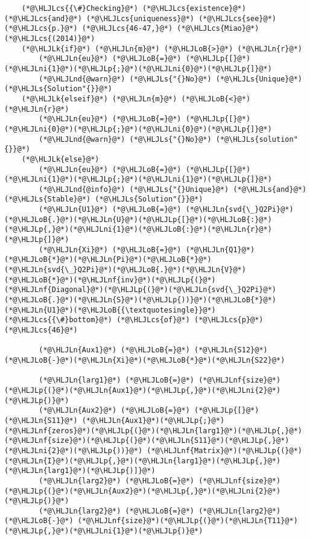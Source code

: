\documentclass[12pt,a4paper]{article}
\newcommand{\HLJLk}[1]{\textcolor[RGB]{148,91,176}{\textbf{#1}}}
\newcommand{\HLJLn}[1]{#1}
\newcommand{\HLJLnd}[1]{\textcolor[RGB]{214,102,97}{#1}}
\newcommand{\HLJLnf}[1]{\textcolor[RGB]{66,102,213}{#1}}
\newcommand{\HLJLs}[1]{\textcolor[RGB]{201,61,57}{#1}}
\newcommand{\HLJLni}[1]{\textcolor[RGB]{59,151,46}{#1}}
\newcommand{\HLJLoB}[1]{\textcolor[RGB]{102,102,102}{\textbf{#1}}}
\newcommand{\HLJLp}[1]{#1}
\newcommand{\HLJLcs}[1]{\textcolor[RGB]{153,153,119}{\textit{#1}}}
\begin{document}
\begin{lstlisting}
    (*@\HLJLcs{{\#}Checking}@*) (*@\HLJLcs{existence}@*) (*@\HLJLcs{and}@*) (*@\HLJLcs{uniqueness}@*) (*@\HLJLcs{see}@*) (*@\HLJLcs{p.}@*) (*@\HLJLcs{46-47,}@*) (*@\HLJLcs{Miao}@*) (*@\HLJLcs{(2014)}@*)
    (*@\HLJLk{if}@*) (*@\HLJLn{m}@*) (*@\HLJLoB{>}@*) (*@\HLJLn{r}@*)
        (*@\HLJLn{eu}@*) (*@\HLJLoB{=}@*) (*@\HLJLp{[}@*)(*@\HLJLni{1}@*)(*@\HLJLp{;}@*)(*@\HLJLni{0}@*)(*@\HLJLp{]}@*)
        (*@\HLJLnd{@warn}@*) (*@\HLJLs{"{}No}@*) (*@\HLJLs{Unique}@*) (*@\HLJLs{Solution"{}}@*)
    (*@\HLJLk{elseif}@*) (*@\HLJLn{m}@*) (*@\HLJLoB{<}@*) (*@\HLJLn{r}@*)
        (*@\HLJLn{eu}@*) (*@\HLJLoB{=}@*) (*@\HLJLp{[}@*)(*@\HLJLni{0}@*)(*@\HLJLp{;}@*)(*@\HLJLni{0}@*)(*@\HLJLp{]}@*)
        (*@\HLJLnd{@warn}@*) (*@\HLJLs{"{}No}@*) (*@\HLJLs{solution"{}}@*)
    (*@\HLJLk{else}@*)
        (*@\HLJLn{eu}@*) (*@\HLJLoB{=}@*) (*@\HLJLp{[}@*)(*@\HLJLni{1}@*)(*@\HLJLp{;}@*)(*@\HLJLni{1}@*)(*@\HLJLp{]}@*)
        (*@\HLJLnd{@info}@*) (*@\HLJLs{"{}Unique}@*) (*@\HLJLs{and}@*) (*@\HLJLs{Stable}@*) (*@\HLJLs{Solution"{}}@*)
        (*@\HLJLn{U1}@*) (*@\HLJLoB{=}@*) (*@\HLJLn{svd{\_}Q2Pi}@*)(*@\HLJLoB{.}@*)(*@\HLJLn{U}@*)(*@\HLJLp{[}@*)(*@\HLJLoB{:}@*)(*@\HLJLp{,}@*)(*@\HLJLni{1}@*)(*@\HLJLoB{:}@*)(*@\HLJLn{r}@*)(*@\HLJLp{]}@*)
        (*@\HLJLn{Xi}@*) (*@\HLJLoB{=}@*) (*@\HLJLn{Q1}@*)(*@\HLJLoB{*}@*)(*@\HLJLn{Pi}@*)(*@\HLJLoB{*}@*)(*@\HLJLn{svd{\_}Q2Pi}@*)(*@\HLJLoB{.}@*)(*@\HLJLn{V}@*)(*@\HLJLoB{*}@*)(*@\HLJLnf{inv}@*)(*@\HLJLp{(}@*)(*@\HLJLnf{Diagonal}@*)(*@\HLJLp{(}@*)(*@\HLJLn{svd{\_}Q2Pi}@*)(*@\HLJLoB{.}@*)(*@\HLJLn{S}@*)(*@\HLJLp{))}@*)(*@\HLJLoB{*}@*)(*@\HLJLn{U1}@*)(*@\HLJLoB{{\textquotesingle}}@*) (*@\HLJLcs{{\#}bottom}@*) (*@\HLJLcs{of}@*) (*@\HLJLcs{p}@*) (*@\HLJLcs{46}@*)

        (*@\HLJLn{Aux1}@*) (*@\HLJLoB{=}@*) (*@\HLJLn{S12}@*)(*@\HLJLoB{-}@*)(*@\HLJLn{Xi}@*)(*@\HLJLoB{*}@*)(*@\HLJLn{S22}@*)

        (*@\HLJLn{larg1}@*) (*@\HLJLoB{=}@*) (*@\HLJLnf{size}@*)(*@\HLJLp{(}@*)(*@\HLJLn{Aux1}@*)(*@\HLJLp{,}@*)(*@\HLJLni{2}@*)(*@\HLJLp{)}@*)
        (*@\HLJLn{Aux2}@*) (*@\HLJLoB{=}@*) (*@\HLJLp{[}@*)(*@\HLJLn{S11}@*) (*@\HLJLn{Aux1}@*)(*@\HLJLp{;}@*)(*@\HLJLnf{zeros}@*)(*@\HLJLp{(}@*)(*@\HLJLn{larg1}@*)(*@\HLJLp{,}@*)(*@\HLJLnf{size}@*)(*@\HLJLp{(}@*)(*@\HLJLn{S11}@*)(*@\HLJLp{,}@*)(*@\HLJLni{2}@*)(*@\HLJLp{))}@*) (*@\HLJLnf{Matrix}@*)(*@\HLJLp{(}@*)(*@\HLJLn{I}@*)(*@\HLJLp{,}@*)(*@\HLJLn{larg1}@*)(*@\HLJLp{,}@*)(*@\HLJLn{larg1}@*)(*@\HLJLp{)]}@*)
        (*@\HLJLn{larg2}@*) (*@\HLJLoB{=}@*) (*@\HLJLnf{size}@*)(*@\HLJLp{(}@*)(*@\HLJLn{Aux2}@*)(*@\HLJLp{,}@*)(*@\HLJLni{2}@*)(*@\HLJLp{)}@*)
        (*@\HLJLn{larg2}@*) (*@\HLJLoB{=}@*) (*@\HLJLn{larg2}@*) (*@\HLJLoB{-}@*) (*@\HLJLnf{size}@*)(*@\HLJLp{(}@*)(*@\HLJLn{T11}@*)(*@\HLJLp{,}@*)(*@\HLJLni{1}@*)(*@\HLJLp{)}@*)


\end{lstlisting}
\end{document}
